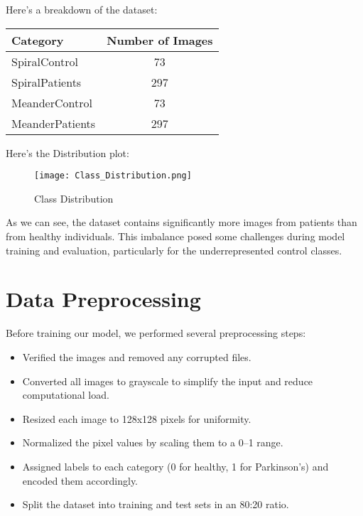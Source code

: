 \documentclass[twocolumn]{article}
\begin{document}
Here’s a breakdown of the dataset:
\begin{center}
\begin{tabular}{lc}
    \toprule
    Category & Number of Images \\
    \midrule
    SpiralControl & 73 \\
    SpiralPatients & 297 \\
    MeanderControl & 73 \\
    MeanderPatients & 297 \\
    \bottomrule
\end{tabular}


Here's the Distribution plot:
\begin{figure}[H]
    \centering
    \texttt{[image: Class\_Distribution.png]}
    \caption{Class Distribution}
    \label{fig:enter-label}
\end{figure}

\end{center}
As we can see, the dataset contains significantly more images from patients than from healthy individuals. This imbalance posed some challenges during model training and evaluation, particularly for the underrepresented control classes.

\section{Data Preprocessing}
Before training our model, we performed several preprocessing steps:
\begin{itemize}
    \item Verified the images and removed any corrupted files.
    \item Converted all images to grayscale to simplify the input and reduce computational load.
    \item Resized each image to 128x128 pixels for uniformity.
    \item Normalized the pixel values by scaling them to a 0–1 range.
    \item Assigned labels to each category (0 for healthy, 1 for Parkinson’s) and encoded them accordingly.
    \item Split the dataset into training and test sets in an 80:20 ratio.
\end{itemize}
\end{document}
